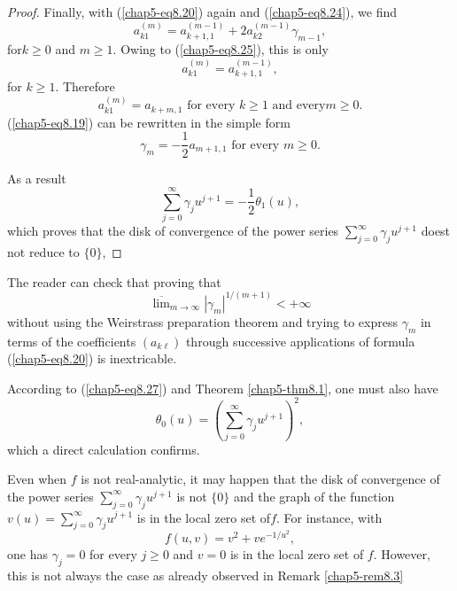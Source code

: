 \begin{proof}
Finally, with (\ref{chap5-eq8.20}) again and (\ref{chap5-eq8.24}), we
find
$$
a_{k1}^{(m)} = a_{k+1, 1}^{(m-1)} + 2a_{k2}^{(m-1)} \gamma_{m-1},
$$
for\pageoriginale $k \geq 0$ and $m \geq 1$. Owing to
(\ref{chap5-eq8.25}), this is only
$$
a_{k1}^{(m)} = a_{k+1, 1}^{(m-1)},
$$
for $k \geq 1$. Therefore
\begin{equation*}
a_{k1}^{(m)} = a_{k+m, 1} \text{ for every } k \geq 1 \text{ and every
} m \geq 0.\tag{8.26}\label{chap5-eq8.26}
\end{equation*}
(\ref{chap5-eq8.19}) can be rewritten in the simple form
$$
\gamma_{m} = - \frac{1}{2} a_{m+1, 1} \text{ for every } m \geq 0.
$$

As a result
\begin{equation*}
\sum\limits_{j=0}^{\infty} \gamma_{j} u^{j+1} = -\frac{1}{2}
\theta_{1}(u),\tag{8.27}\label{chap5-eq8.27} 
\end{equation*}
which proves that the disk of convergence of the power series
$\sum\limits_{j=0}^{\infty} \gamma_{j} u^{j+1}$ doest
not reduce to $\{0\}$,
\end{proof}

\begin{remark}\label{chap5-rem8.4}
The reader can check that proving that 
$$\overline{\lim\limits}_{m \to 
  \infty} | \gamma_{m}|^{1 / (m+1)} < + \infty$$ 
without using the
Weirstrass preparation theorem and trying to express $\gamma_{m}$ in
terms of the coefficients $(a_{k\ell})$ through successive
applications of formula (\ref{chap5-eq8.20}) is inextricable.
\end{remark}

\begin{remark}\label{chap5-rem8.5}
According to (\ref{chap5-eq8.27}) and Theorem \ref{chap5-thm8.1}, one
must also have
$$
\theta_{0}(u) = \left(\sum\limits_{j=0}^{\infty} \gamma_{j} u^{j+1}\right)^{2},
$$
which a direct calculation confirms.
\end{remark}

\begin{remark}\label{chap5-rem8.6}
Even when $f$ is not real-analytic, it may happen that the disk of
convergence of the power series $\sum\limits_{j=0}^{\infty} \gamma_{j}
u^{j+1}$ is not $\{0\}$ and the graph of the function $v(u) =
\sum\limits_{j=0}^{\infty} \gamma_{j} u^{j+1}$ is in the local zero
set of\pageoriginale $f$. For instance, with
$$
f(u, v) = v^{2} + ve^{-1/u^{2}},
$$
one has $\gamma_{j} = 0$ for every $j \geq 0$ and $v = 0$ is in the
local zero set of $f$. However, this is not always the case as already
observed in Remark \ref{chap5-rem8.3}
\end{remark}

